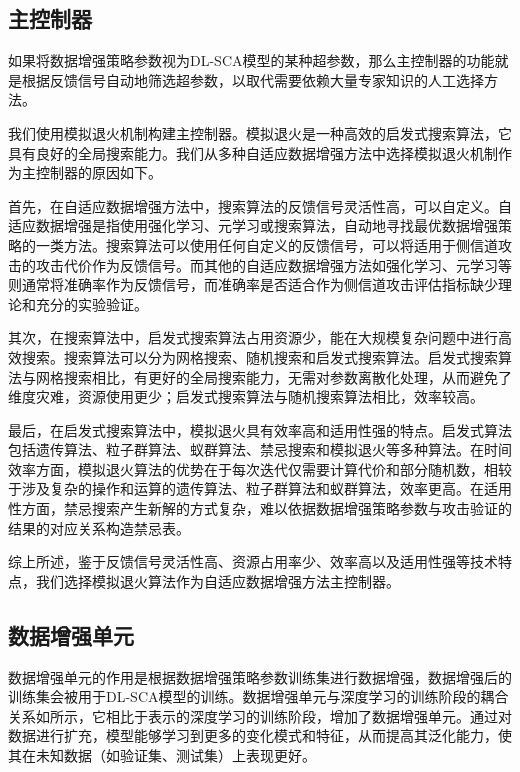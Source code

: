 {	\subsection{主控制器}\label{subs:conceptcontroller}
	如果将数据增强策略参数视为DL-SCA模型的某种超参数，那么主控制器的功能就是根据反馈信号自动地筛选超参数，以取代需要依赖大量专家知识的人工选择方法。
	
	{\color{\dupc}
		
		我们使用模拟退火机制构建主控制器。模拟退火是一种高效的启发式搜索算法，它具有良好的全局搜索能力。我们从多种自适应数据增强方法中选择模拟退火机制作为主控制器的原因如下。 
		
		首先，在自适应数据增强方法中，搜索算法的反馈信号灵活性高，可以自定义。自适应数据增强是指使用强化学习、元学习或搜索算法，自动地寻找最优数据增强策略的一类方法。搜索算法可以使用任何自定义的反馈信号，可以将适用于侧信道攻击的攻击代价作为反馈信号。而其他的自适应数据增强方法如强化学习、元学习等则通常将准确率作为反馈信号，而准确率是否适合作为侧信道攻击评估指标缺少理论和充分的实验验证。
		
		其次，在搜索算法中，启发式搜索算法占用资源少，能在大规模复杂问题中进行高效搜索。搜索算法可以分为网格搜索、随机搜索和启发式搜索算法。启发式搜索算法与网格搜索相比，有更好的全局搜索能力，无需对参数离散化处理，从而避免了维度灾难，资源使用更少；启发式搜索算法与随机搜索算法相比，效率较高。
		
		最后，在启发式搜索算法中，模拟退火具有效率高和适用性强的特点。启发式算法包括遗传算法、粒子群算法、蚁群算法、禁忌搜索和模拟退火等多种算法。在时间效率方面，模拟退火算法的优势在于每次迭代仅需要计算代价和部分随机数，相较于涉及复杂的操作和运算的遗传算法、粒子群算法和蚁群算法，效率更高。在适用性方面，禁忌搜索产生新解的方式复杂，难以依据数据增强策略参数与攻击验证的结果的对应关系构造禁忌表。
		
		综上所述，鉴于反馈信号灵活性高、资源占用率少、效率高以及适用性强等技术特点，我们选择模拟退火算法作为自适应数据增强方法主控制器。
	}
	\subsection{数据增强单元}\label{subs:conceptcda}
	
	数据增强单元的作用是根据数据增强策略参数训练集进行数据增强，数据增强后的训练集会被用于DL-SCA模型的训练。数据增强单元与深度学习的训练阶段的耦合关系如所示，它相比于表示的深度学习的训练阶段，增加了数据增强单元。通过对数据进行扩充，模型能够学习到更多的变化模式和特征，从而提高其泛化能力，使其在未知数据（如验证集、测试集）上表现更好。
	
}
